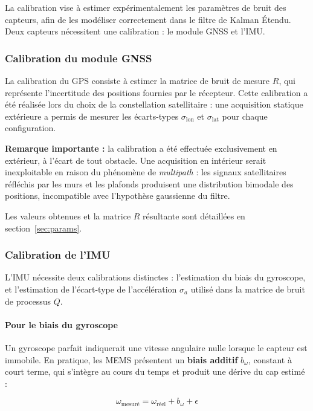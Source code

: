 La calibration vise à estimer expérimentalement les paramètres de bruit des
capteurs, afin de les modéliser correctement dans le filtre de Kalman Étendu.
Deux capteurs nécessitent une calibration : le module GNSS et l'IMU.

\subsubsection{Calibration du module GNSS}

La calibration du GPS consiste à estimer la matrice de bruit de mesure $R$,
qui représente l'incertitude des positions fournies par le récepteur. Cette
calibration a été réalisée lors du choix de la constellation satellitaire :
une acquisition statique extérieure a permis de mesurer les écarts-types
$\sigma_{\text{lon}}$ et $\sigma_{\text{lat}}$ pour chaque configuration.

\textbf{Remarque importante :} la calibration a été effectuée exclusivement
en extérieur, à l'écart de tout obstacle. Une acquisition en intérieur serait
inexploitable en raison du phénomène de \textit{multipath} : les signaux
satellitaires réfléchis par les murs et les plafonds produisent une
distribution bimodale des positions, incompatible avec l'hypothèse gaussienne
du filtre.

Les valeurs obtenues et la matrice $R$ résultante sont détaillées en
section~\ref{sec:params}.

\subsubsection{Calibration de l'IMU}

L'IMU nécessite deux calibrations distinctes : l'estimation du biais du
gyroscope, et l'estimation de l'écart-type de l'accélération $\sigma_a$
utilisé dans la matrice de bruit de processus $Q$.

\paragraph{Pour le biais du gyroscope}

Un gyroscope parfait indiquerait une vitesse angulaire nulle lorsque le
capteur est immobile. En pratique, les MEMS présentent un \textbf{biais
additif} $b_\omega$, constant à court terme, qui s'intègre au cours du temps
et produit une dérive du cap estimé :

\begin{equation}
    \omega_{\text{mesuré}} = \omega_{\text{réel}} + b_\omega + \epsilon
\end{equation}

